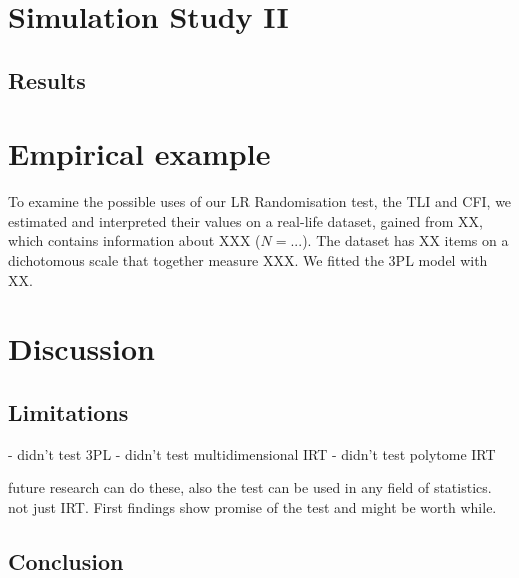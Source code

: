 \documentclass[Royal,sageapa,times,doublespace]{sagej}
\begin{document}
\newpage

\section{Simulation Study II}

\subsection{Results}

\section{Empirical example}
To examine the possible uses of our LR Randomisation test, the TLI and CFI, we estimated and interpreted their values on a real-life dataset, gained from XX, which contains information about XXX ($N = ...$). The dataset has XX items on a dichotomous scale that together measure XXX. We fitted the 3PL model with XX.

\section{Discussion}

\subsection{Limitations}

- didn't test 3PL
- didn't test multidimensional IRT
- didn't test polytome IRT

future research can do these, also the test can be used in any field of statistics. not just IRT. First findings show promise of the test and might be worth while. 


\subsection{Conclusion}

\newpage

\nocite{*}


\end{document}
